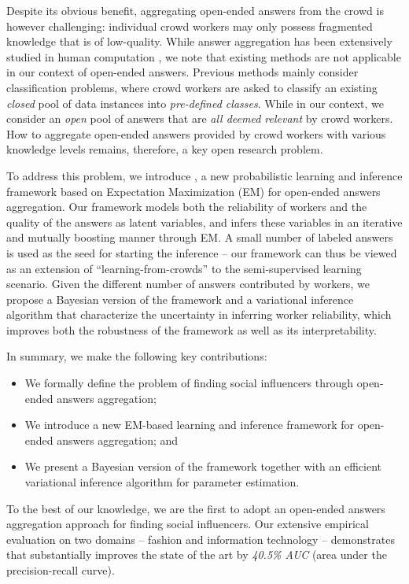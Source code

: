 Despite its obvious benefit, aggregating open-ended answers from the crowd is however challenging: individual crowd workers may only possess fragmented knowledge that is of low-quality. While answer aggregation has been extensively studied in human computation \cite{dawid1979maximum,whitehill2009whose,ZhengLLSC17}, we note that existing methods are not applicable in our context of open-ended answers. Previous methods mainly consider classification problems, where crowd workers are asked to classify an existing \emph{closed} pool of data instances into \emph{pre-defined classes}. While in our context, we consider an \emph{open} pool of answers that are \emph{all deemed relevant} by crowd workers. How to aggregate open-ended answers provided by crowd workers with various knowledge levels remains, therefore, a key open research problem.

To address this problem, we introduce \sys, a new probabilistic learning and inference framework based on Expectation Maximization (EM) for open-ended answers aggregation. Our framework models both the reliability of workers and the quality of the answers as latent variables, and infers these variables in an iterative and mutually boosting manner through EM. A small number of labeled answers is used as the seed for starting the inference -- our framework can thus be viewed as an extension of ``learning-from-crowds''  \cite{raykar2010learning,tian2012learning,yang2018leveraging} to the semi-supervised learning scenario. Given the different number of answers contributed by workers, we propose a Bayesian version of the framework and a variational inference algorithm that characterize the uncertainty in inferring worker reliability, which improves both the robustness of the framework as well as its interpretability. 

In summary, we make the following key contributions:
\begin{itemize}
\item We formally define the problem of finding social influencers through open-ended answers aggregation;
\item We introduce a new EM-based learning and inference framework for open-ended answers aggregation; and
\item We present a Bayesian version of the framework together with an efficient variational inference algorithm for parameter estimation. 
\end{itemize}

To the best of our knowledge, we are the first to adopt an open-ended answers aggregation approach for finding social influencers. Our extensive empirical evaluation on two domains -- fashion and information technology -- demonstrates that \sys substantially improves the state of the art by \emph{40.5\% AUC} (area under the precision-recall curve).

